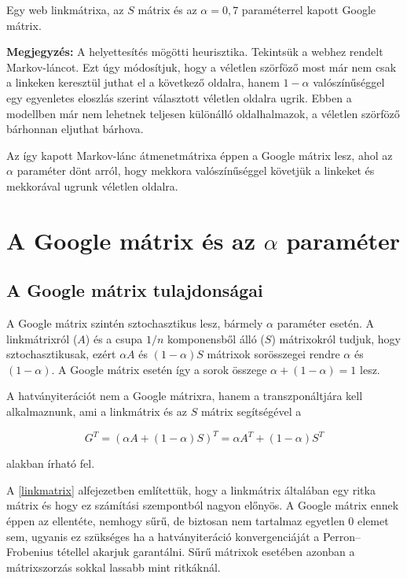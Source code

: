 \documentclass[12pt,a4paper]{article}
\begin{document}
\vspace{0.1 cm}
\centerline{Egy web linkmátrixa, az $S$ mátrix és az $\alpha = 0,7$ paraméterrel kapott Google mátrix.}
\vspace{0.3 cm}

\textbf{Megjegyzés:} A helyettesítés mögötti heurisztika. \newline
Tekintsük a webhez rendelt Markov-láncot. Ezt úgy módosítjuk, hogy a véletlen szörföző most már nem csak a linkeken keresztül juthat el a következő oldalra, hanem $1-\alpha$ valószínűséggel egy egyenletes eloszlás szerint választott véletlen oldalra ugrik. Ebben a modellben már nem lehetnek teljesen különálló oldalhalmazok, a véletlen szörföző bárhonnan eljuthat bárhova.

Az így kapott Markov-lánc átmenetmátrixa éppen a Google mátrix lesz, ahol az $\alpha$ paraméter dönt arról, hogy mekkora valószínűséggel követjük a linkeket és mekkorával ugrunk véletlen oldalra.

\section{A Google mátrix és az $\alpha$ paraméter}

\subsection{A Google mátrix tulajdonságai}\label{google_matrix_tul}

A Google mátrix szintén sztochasztikus lesz, bármely $\alpha$ paraméter esetén. A linkmátrixról ($A$) és a csupa $1/n$ komponensből álló ($S$) mátrixokról tudjuk, hogy sztochasztikusak, ezért $\alpha A$ és $(1-\alpha)S$ mátrixok sorösszegei rendre $\alpha$ és $(1-\alpha)$. A Google mátrix esetén így a sorok összege $\alpha+(1-\alpha) = 1$ lesz.

A hatványiterációt nem a Google mátrixra, hanem a transzponáltjára kell alkalmaznunk, ami a linkmátrix és az $S$ mátrix segítségével a 

\[ G^T = (\alpha A + (1-\alpha)S)^T = \alpha A^T + (1-\alpha) S^T \]

alakban írható fel.

\vspace{0.2cm}

A \ref{linkmatrix} alfejezetben említettük, hogy a linkmátrix általában egy ritka mátrix és hogy ez számítási szempontból nagyon előnyös. A Google mátrix ennek éppen az ellentéte, nemhogy sűrű, de biztosan nem tartalmaz egyetlen 0 elemet sem, ugyanis ez szükséges ha a hatványiteráció konvergenciáját a Perron–Frobenius tétellel akarjuk garantálni. Sűrű mátrixok esetében azonban a mátrixszorzás sokkal lassabb mint ritkáknál.
\end{document}
